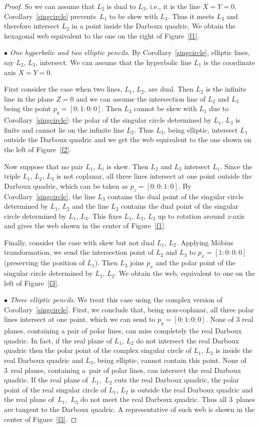 \documentclass[pdftex]{sigma}
\numberwithin{equation}{section}
\begin{document}
\begin{proof}
So we can assume that $L_2$ is dual to $L_3$, i.e., it is the line $X=Y=0$. Corollary~\ref{singcircle} prevents~$L_1$ to be skew with $L_3$. Thus it meets $L_3$ and therefore intersect $L_2$ in a point inside the Darboux quadric.
We obtain the hexagonal web equivalent to the one on the right of Figure~\ref{f1}.

$\bullet$ {\it One hyperbolic and two elliptic pencils}.
By Corollary~\ref{singcircle}, elliptic lines, say $L_2$, $L_3$, intersect. We can assume that the hyperbolic line $L_1$ is the coordinate axis $X=Y=0$.

First consider the case when two lines, $L_1$, $L_2$, are dual. Then $L_2$ is the infinite line in the plane $Z=0$ and we can assume the intersection line of $L_2$ and $L_3$ being the point $p_y=[0:1:0:0]$. Then $L_3$ cannot be skew with $L_1$ due to Corollary~\ref{singcircle}: the polar of the singular circle determined by $L_1$, $L_3$ is finite and cannot lie on the infinite line $L_2$. Thus $L_3$, being elliptic, intersect $L_1$ outside the Darboux quadric and we get the web equivalent to the one shown on the left of Figure~\ref{f2}.

Now suppose that no pair $L_1$, $L_i$ is skew. Then $L_2$ and $L_3$ intersect $L_1$. Since the triple $L_1$, $L_2$, $L_3$ is not coplanar, all three lines intersect at one point outside the Darboux quadric, which can be taken as $p_z=[0:0:1:0]$. By Corollary~\ref{singcircle}, the line $L_3$ contains the dual point of the singular circle determined by $L_1$, $L_2$ and the line $L_2$ contains the dual point of the singular circle determined by $L_1$, $L_3$. This fixes $L_1$, $L_2$, $L_3$ up to rotation around $z$-axis and gives the web shown in the center of Figure~\ref{f1}.

Finally, consider the case with skew but not dual $L_1$, $L_2$. Applying M\"obius transformation, we send the intersection point of $L_2$ and $L_3$ to $p_x=[1:0:0:0]$ (preserving the position of $L_1$). Then $L_3$ joins $p_x$ and the polar point of the singular circle determined by $L_1$, $L_2$. We obtain the web, equivalent to one on the left of Figure~\ref{f3}.


$\bullet$ {\it Three elliptic pencils}.
We treat this case using the complex version of Corollary~\ref{singcircle}. First, we conclude that, being non-coplanar, all three polar lines intersect at one point, which we can send to $p_y=[0:1:0:0]$. None of 3 real planes, containing a pair of polar lines, can miss completely the real Darboux quadric. In fact, if the real plane of $L_1$, $L_2$ do not intersect the real Darboux quadric then the polar point of the complex singular circle of $L_1$, $L_2$ is inside the real Darboux quadric and $L_3$, being elliptic, cannot contain this point. None of 3~real planes, containing a~pair of polar lines, can intersect the real Darboux quadric. If the real plane of~$L_1$,~$L_2$ cuts the real Darboux quadric, the polar point of the real singular circle of $L_1$, $L_2$ is outside the real Darboux quadric and the real plane of~$L_1$,~$L_3$ do not meet the real Darboux quadric. Thus all 3~planes are tangent to the Darboux quadric.
A representative of such web is shown in the center of Figure~\ref{f3}.


\end{proof}
\end{document}
